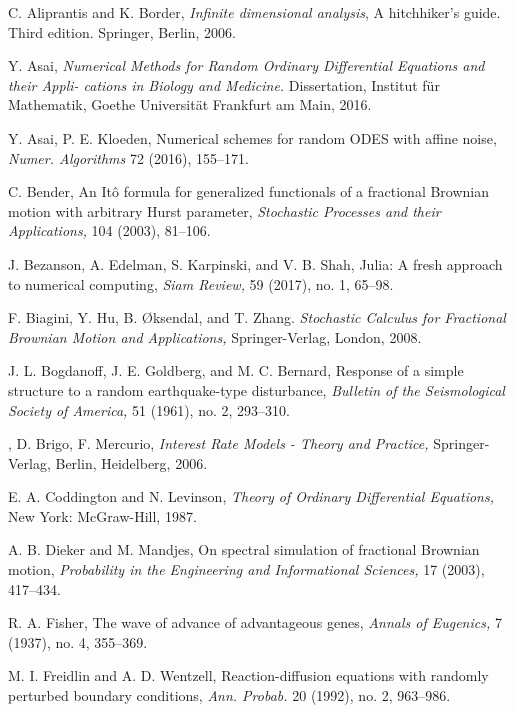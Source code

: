 \documentclass[reqno,12pt]{amsart}
\theoremstyle{plain} %
\theoremstyle{definition} %
\begin{document}
\begin{thebibliography}{25}

     C. Aliprantis and K. Border, \emph{Infinite dimensional analysis}, A hitchhiker's guide. Third edition. Springer, Berlin, 2006.

     Y. Asai, \emph{Numerical Methods for Random Ordinary Differential Equations and their Appli-
    cations in Biology and Medicine.} Dissertation, Institut f\"ur Mathematik, Goethe Universit\"at Frankfurt am Main, 2016.

     Y. Asai, P. E. Kloeden, Numerical schemes for random ODES with affine noise, \emph{Numer. Algorithms} 72 (2016), 155--171.

     C. Bender, An It\^o formula for generalized functionals of a fractional Brownian motion with arbitrary Hurst parameter, \emph{Stochastic Processes and their Applications,} 104 (2003), 81--106.

     J. Bezanson, A. Edelman, S. Karpinski, and V. B. Shah, Julia: A fresh approach to numerical computing, \emph{Siam Review,} 59 (2017), no. 1, 65--98.

     F. Biagini, Y. Hu, B. {\O}ksendal, and T. Zhang. \emph{Stochastic Calculus for Fractional Brownian Motion and Applications,} Springer-Verlag, London, 2008.

     J. L. Bogdanoff, J. E. Goldberg, and M. C. Bernard, Response of a simple structure to a random earthquake-type disturbance, \emph{Bulletin of the Seismological Society of America,} 51 (1961), no. 2, 293--310.

    , D. Brigo, F. Mercurio, \emph{Interest Rate Models - Theory and Practice,} Springer-Verlag, Berlin, Heidelberg, 2006.

     E. A. Coddington and N. Levinson, \emph{Theory of Ordinary Differential Equations,} New York: McGraw-Hill, 1987.

     A. B. Dieker and M. Mandjes, On spectral simulation of fractional Brownian motion, \emph{Probability in the Engineering and Informational Sciences,} 17 (2003), 417--434.

     R. A. Fisher, The wave of advance of advantageous genes, \emph{Annals of Eugenics,} 7 (1937), no. 4, 355--369.

     M. I. Freidlin and A. D. Wentzell, Reaction-diffusion equations with randomly perturbed boundary conditions, \emph{Ann. Probab.} 20 (1992), no. 2, 963--986.


\end{thebibliography}
\end{document}
